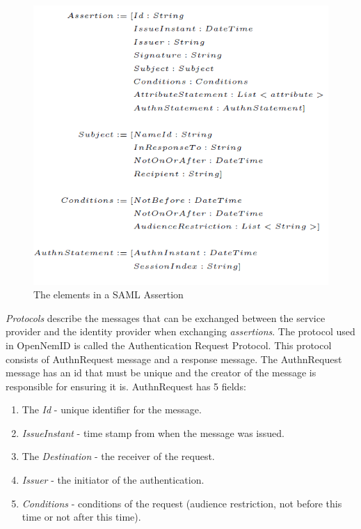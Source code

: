 \documentclass[twosided]{report}
\begin{document}
\begin{figure}[H]
	\centering
	\includegraphics[scale=0.5]{images/SAMLAssertion.png}
	\caption{The elements in a SAML Assertion}
\end{figure}
\par

\emph{Protocols} describe the messages that can be exchanged between the service provider and the identity provider when exchanging \emph{assertions}. The protocol used in OpenNemID is called the Authentication Request Protocol. This protocol consists of AuthnRequest message and a response message. The AuthnRequest message has an id that must be unique and the creator of the message is responsible for ensuring it is.
AuthnRequest has 5 fields:
\begin{enumerate}
	\item The \emph{Id} - unique identifier for the message.
	\item \emph{IssueInstant} - time stamp from when the message was issued.
	\item The \emph{Destination} - the receiver of the request.
	\item \emph{Issuer} - the initiator of the authentication.
	\item \emph{Conditions} - conditions of the request (audience restriction, not before this time or not after this time).
\end{enumerate}
\end{document}
